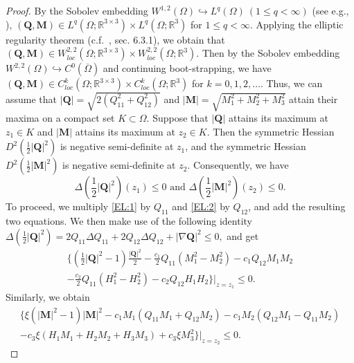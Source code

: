 \documentclass{article}
\def\Qvec{\mathbf{Q}}
\def \Mvec{\mathbf{M}}
\begin{document}
\begin{proof}
By the Sobolev embedding $W^{1,2}\left(\Omega\right)\hookrightarrow L^q\left(\Omega\right)~\left(1\leq q<\infty\right)$ (see e.g., \cite[Theorem 6.1-3]{ciarlet2021mathematical}), $\left(\Qvec, \Mvec\right)\in L^q\left(\Omega; \mathbb R^{3\times 3}\right)\times L^q\left(\Omega; \mathbb R^3\right)$ for $1\leq q<\infty$. Applying the elliptic regularity theorem (c.f.\ \cite{evans2022partial}, sec. 6.3.1), we obtain that $\left(\Qvec, \Mvec\right)\in W^{2,2}_{loc}\left(\Omega; \mathbb R^{3\times 3}\right)\times W^{2,2}_{loc}\left(\Omega; \mathbb R^{3}\right)$. Then by the Sobolev embedding $W^{2,2}\left(\Omega\right)\hookrightarrow C^{0}\left(\overline{\Omega}\right)$ \cite[Theorem 6.1-3]{ciarlet2021mathematical} and continuing boot-strapping, we have $\left(\Qvec, \Mvec\right)\in C^{k}_{loc}\left(\Omega; \mathbb R^{3\times 3}\right)\times C^{k}_{loc}\left(\Omega; \mathbb R^{3}\right)$ for $k=0, 1, 2,\hdots$. Thus, we can assume that $|\Qvec|=\sqrt{2\left(Q_{11}^2+Q_{12}^2\right)}$ and $|\Mvec|=\sqrt{M_1^2+M_2^2+M_3^2}$ attain their maxima on a compact set $K\subset\Omega$. Suppose that $|\Qvec|$ attains its maximum at $z_1\in K$ and $|\Mvec|$ attains its maximum at $z_2\in K$. Then the symmetric Hessian $D^2\left(\frac{1}{2}|\Qvec|^2\right)$ is negative semi-definite at $z_1$, and the symmetric Hessian $D^2\left(\frac{1}{2}|\Mvec|^2\right)$ is negative semi-definite at $z_2$. Consequently, we have
$$\Delta \left(\frac{1}{2}|\Qvec|^2\right)\left(z_1\right)\le 0 \mbox{ and }\Delta \left(\frac{1}{2}|\Mvec|^2\right)(z_2)\le 0.$$
To proceed, we multiply \eqref{EL:1} by $Q_{11}$ and \eqref{EL:2} by $Q_{12}$, and add the resulting two equations. We then make use of the following identity $
\Delta\left(\frac{1}{2}|\Qvec|^2\right)=2Q_{11}\Delta Q_{11} + 2Q_{12}\Delta Q_{12}+|\nabla\Qvec|^2\le 0,$
and get
\begin{eqnarray}\label{max:28}
\bigg\{\left(\frac{1}{2}|\Qvec|^2-1\right)\frac{|\Qvec|^2}{2}-\frac{c_1}{2}Q_{11}(M_1^2 - M_2^2) - c_1Q_{12}M_1M_2\nonumber\\-\frac{c_2}{2}Q_{11}\left(H_1^2-H_2^2\right)-c_2Q_{12}H_1H_2\bigg\}\bigg|_{z=z_1}\le 0.
\end{eqnarray}
Similarly, we obtain
\begin{eqnarray}\label{max:29}
\bigg\{\xi\left(|\Mvec|^2-1\right)|\Mvec|^2-c_1M_1\left(Q_{11}M_1+Q_{12}M_2\right)-c_1M_2\left(Q_{12}M_1-Q_{11}M_2\right)\nonumber\\
-c_3\xi\left(H_1M_1+H_2M_2+H_3M_3\right)+c_3\xi M_3^2\bigg\}\bigg|_{z=z_2}\le 0.

\end{eqnarray}
\end{proof}
\end{document}
